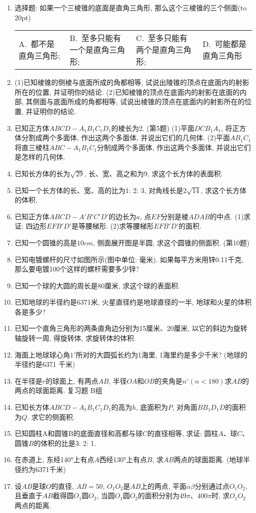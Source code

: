 \documentclass[10pt,a4paper]{article}
\newcommand{\bracket}[1]{(\hbox to #1pt{})}
\newcommand{\fourch}[4]{\par\begin{tabular}{p{.23\textwidth}p{.23\textwidth}p{.23\textwidth}p{.23\textwidth}}
A.~#1 &B.~#2& C.~#3& D.~#4
\end{tabular}}
\begin{document}
\begin{enumerate}[1.]
\item 选择题:
如果一个三棱锥的底面是直角三角形, 那么这个三棱锥的三个侧面\bracket{20}
\fourch{都不是直角三角形;}{至多只能有一个是直角三角形;}{至多只能有两个是直角三角形;}{可能都是直角三角形}
\item (1)已知棱锥的侧棱与底面所成的角都相等, 试说出陵锥的顶点在底面内的射影所在的位置, 并证明你的结论.
(2)已知棱锥的顶点在底面内的射影在底面的内部, 其侧面与底面所成的角都相等, 试说出棱锥的顶点在底面内的射影所在的位置, 并证明你的结论.
\item 已知正方体$ABCD-A_1B_1C_1D_1$的棱长为2.
(第5题)
(1)平面$DCB_1A_1$, 将正方体分割成两个多面体, 作出这两个多面体, 并说出它们的几何体.
(2)平面$AB_1C_1$将直三棱柱$ABC-A_1B_1C_1$分制成两个多面体, 作出这两个多面体, 并说出它们是怎样的几何体.
\item 已知长方体的长为$\sqrt {29}$, 长、宽、高之和为9, 求这个长方体的表面积.
\item 已知一个长方体的长、宽、高的比为1: 2: 3, 对角线长是$2\sqrt {14}$, 求这个长方体的体积.
\item 已知正方体$ABCD-A'B'C'D'$的边长为$a$, 点$EF$分别是棱$ADAB$的中点.
(1)求证: 四边形$EFB'D'$是等腰梯形.
(2)求等腰梯形$EFB'D'$的面积.
\item 已知一个圆锥的高是$10cm$, 侧面展开图是半圆, 求这个圆锥的侧面积.
(第10题)
\item 已知电镀螺杆的尺寸如图所示(图中单位: 毫米). 如果每平方米用锌0.11千克, 那么要电镀100个这样的螺杆需要多少锌?
\item 已知一个球的大圆的周长是80厘米, 求这个球的表面积.
\item 已知地球的半径约是6371米, 火星直径约是地球直径的一半, 地球和火星的体积各是多少?
\item 已知一个直角三角形的两条直角边分别为15厘米、20厘米, 以它的斜边为旋转轴旋转一周, 得旋转体, 求旋转体的体积.
\item 海面上地球球心角$1'$所对的大圆弧长约为1海里, 1海里约是多少千米? (地球的半径约是6371 千米)
\item 在半径是$r$的球面上, 有两点$AB$, 半径$OA$和$OB$的夹角是$n^\circ (n<180)$求$AB$的两点的球面距离.
复习题
B组
\item 已知长方体$ABCD-A_1B_1C_1D_1$的高为$h$, 底面积为$P$, 对角面$BB_1D_1D$的面积为$Q$.
求它的侧面积.
\item 已知圆柱A和圆锥B的底面直径和高都与球$C$的直径相等, 求证: 圆柱$A$、球$C$、圆锥$B$的体积的比是3: 2: 1.
\item 在赤道上, 东经140°上有点$A$西经130°上有点$B$, 求$AB$两点的球面距离. (地球半径约为6371千米)
\item 设$AB$是球$O$的直径, $AB=50$, $O_1O_2$是$AB$上的两点, 平面$\alpha \beta$分别通过点$O_1O_2$, 且垂直于$AB$截得圆$O_1$圆$O_2$, 当圆$O_1$圆$O_2$的面积分别为$49\pi$、$400\pi$时, 求$O_1O_2$两点的距离.

\end{enumerate}
\end{document}
